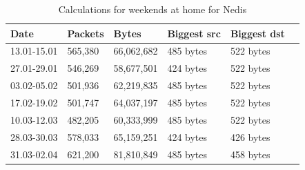 \begin{table}[H]
    \centering
    \caption{Calculations for weekends at home for Nedis}
    \begin{tabular}{|l|l|l|l|l|l|}
        \hline
        \textbf{Date}    & \textbf{Packets} & \textbf{Bytes} & \textbf{Biggest src} & \textbf{Biggest dst} \\ \hline
        13.01-15.01      & 565,380            & 66,062,682           & 485 bytes            & 522 bytes            \\ \hline
        27.01-29.01      & 546,269            & 58,677,501           & 424 bytes            & 522 bytes            \\ \hline
        03.02-05.02      & 501,936            & 62,219,835           & 485 bytes            &    522 bytes            \\ \hline
        17.02-19.02      & 501,747            & 64,037,197           & 485 bytes            & 522 bytes            \\ \hline
        10.03-12.03      & 482,205            & 60,333,999           & 485 bytes            & 522 bytes            \\ \hline
        28.03-30.03      & 578,033            & 65,159,251           & 424 bytes            & 426 bytes            \\ \hline
        31.03-02.04      & 621,200            & 81,810,849           & 485 bytes            & 458 bytes            \\ \hline
    \end{tabular}
    \label{tab:NedisHomeWeekends}
\end{table}

